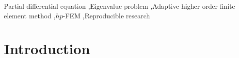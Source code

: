 \documentclass[preprint,12pt]{elsarticle}
\begin{document}
\begin{frontmatter}
\begin{keyword}
Partial differential equation \sep Eigenvalue problem \sep Adaptive higher-order finite element
method \sep $hp$-FEM \sep Reproducible research
\end{keyword}

\end{frontmatter}




\section{Introduction}\label{sec:intro}
\end{document}
